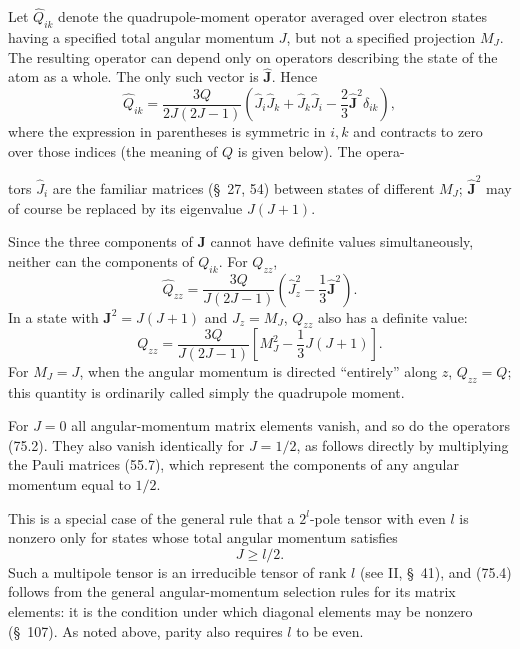 Let $\widehat Q_{ik}$ denote the quadrupole-moment operator averaged over electron states having a specified total angular momentum $J$, but not a specified projection $M_J$. The resulting operator can depend only on operators describing the state of the atom as a whole. The only such vector is $\widehat{\mathbf J}$. Hence
\begin{equation}
 \widehat Q_{ik}=\frac{3Q}{2J(2J-1)}\left(\widehat J_i\widehat J_k+\widehat J_k\widehat J_i-\frac23\widehat{\mathbf J}^{2}\delta_{ik}\right),
 \tag{75.2}
\end{equation}
where the expression in parentheses is symmetric in $i,k$ and contracts to zero over those indices (the meaning of $Q$ is given below). The opera-

tors $\widehat J_i$ are the familiar matrices (\S~27, 54) between states of different $M_J$; $\widehat{\mathbf J}^{2}$ may of course be replaced by its eigenvalue $J(J+1)$.

Since the three components of $\mathbf J$ cannot have definite values simultaneously, neither can the components of $Q_{ik}$. For $Q_{zz}$,
\[\widehat Q_{zz}=\frac{3Q}{J(2J-1)}\left(\widehat J_z^2-\frac13\widehat{\mathbf J}^{2}\right).\]
In a state with $\mathbf J^2=J(J+1)$ and $J_z=M_J$, $Q_{zz}$ also has a definite value:
\begin{equation}Q_{zz}=\frac{3Q}{J(2J-1)}\left[M_J^2-\frac13J(J+1)\right].\tag{75.3}\end{equation}
For $M_J=J$, when the angular momentum is directed ``entirely'' along $z$, $Q_{zz}=Q$; this quantity is ordinarily called simply the quadrupole moment.

For $J=0$ all angular-momentum matrix elements vanish, and so do the operators (75.2). They also vanish identically for $J=1/2$, as follows directly by multiplying the Pauli matrices (55.7), which represent the components of any angular momentum equal to $1/2$.

This is a special case of the general rule that a $2^l$-pole tensor with even $l$ is nonzero only for states whose total angular momentum satisfies
\begin{equation}J\geqslant l/2.\tag{75.4}\end{equation}
Such a multipole tensor is an irreducible tensor of rank $l$ (see II, \S~41), and (75.4) follows from the general angular-momentum selection rules for its matrix elements: it is the condition under which diagonal elements may be nonzero (\S~107). As noted above, parity also requires $l$ to be even.

